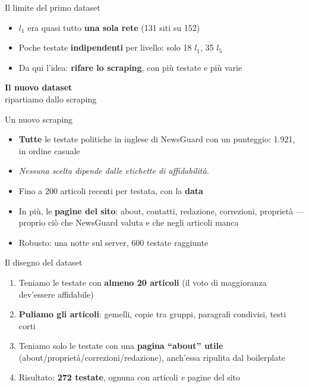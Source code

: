 \documentclass[aspectratio=169]{beamer}
\newcommand{\hl}[1]{\textbf{#1}}
\newcommand{\divider}[2]{%
  \begin{frame}[plain]
    \vfill
    \begin{center}
      {\color{dividerblue}\Huge\textbf{#1}}\\[0.8em]
      {\large #2}
    \end{center}
    \vfill
  \end{frame}}
\begin{document}
\begin{frame}{Il limite del primo dataset}
  \vfill
  \begin{itemize}[<+->]
    \setlength\itemsep{0.8em}
    \item $l_1$ era quasi tutto \hl{una sola rete} (131 siti su 152)
    \item Poche testate \hl{indipendenti} per livello: solo 18 $l_1$, 35 $l_5$
    \item Da qui l'idea: \hl{rifare lo scraping}, con pi\`u testate e pi\`u varie
  \end{itemize}
  \vfill
\end{frame}

\divider{Il nuovo dataset}{ripartiamo dallo scraping}

\begin{frame}{Un nuovo scraping}
  \vfill
  \begin{itemize}[<+->]
    \setlength\itemsep{0.8em}
    \item \hl{Tutte} le testate politiche in inglese di NewsGuard con un punteggio: 1.921, in ordine casuale
    \item[] {\small\itshape Nessuna scelta dipende dalle etichette di affidabilit\`a.}
    \item Fino a 200 articoli recenti per testata, con la \hl{data}
    \item In pi\`u, le \hl{pagine del sito}: about, contatti, redazione, correzioni, propriet\`a --- proprio ci\`o che NewsGuard valuta e che negli articoli manca
    \item Robusto: una notte sul server, 600 testate raggiunte
  \end{itemize}
  \vfill
\end{frame}

\begin{frame}{Il disegno del dataset}
  \vfill
  \begin{enumerate}[<+->]
    \setlength\itemsep{0.8em}
    \item Teniamo le testate con \hl{almeno 20 articoli} (il voto di maggioranza dev'essere affidabile)
    \item \hl{Puliamo gli articoli}: gemelli, copie tra gruppi, paragrafi condivisi, testi corti
    \item Teniamo solo le testate con una \hl{pagina ``about'' utile} (about/propriet\`a/correzioni/redazione), anch'essa ripulita dal boilerplate
    \item Risultato: \hl{272 testate}, ognuna con articoli \emph{e} pagine del sito
  \end{enumerate}
  \vfill
\end{frame}
\end{document}
